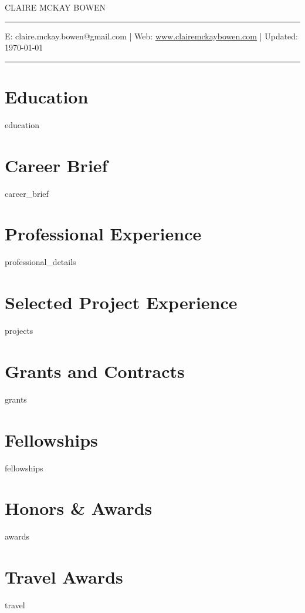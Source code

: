 \documentclass[11pt, letterpaper, roman]{moderncv} %
\begin{document}
\vspace{-10pt}
\centerline{\huge{CLAIRE MCKAY BOWEN}}
\vspace{10pt}
\hrule
\vspace{5pt}
\centerline{\small E: claire.mckay.bowen@gmail.com | Web: \href{https://www.clairemckaybowen.com}{www.clairemckaybowen.com} | Updated: \today}
\vspace{5pt}
\hrule

\section{Education}
{education}

\vspace{-10pt}
\section{Career Brief}
{career_brief}

\vspace{-10pt}
\section{Professional Experience}
{professional_details}

\section{Selected Project Experience}
{projects}
    
\section{Grants and Contracts}
{grants}

\section{Fellowships}
{fellowships}

\section{Honors \& Awards}
{awards}

\section{Travel Awards}
{travel}
    
\end{document}
